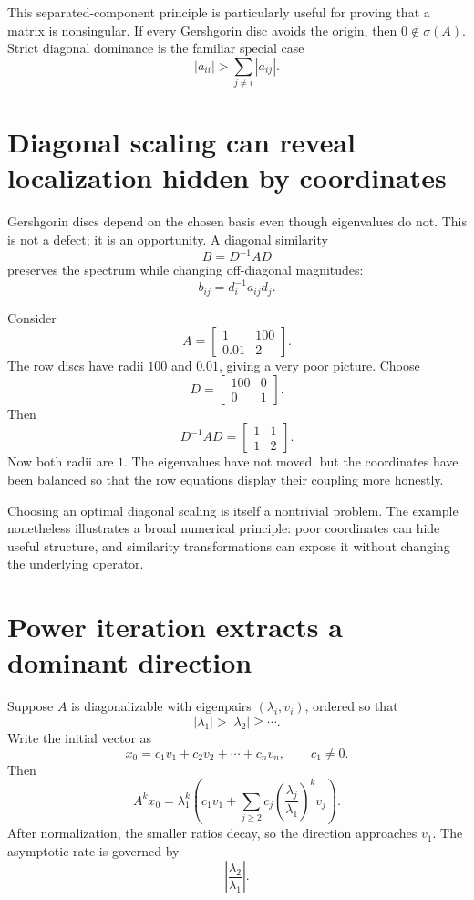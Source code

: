This separated-component principle is particularly useful for proving that a matrix is nonsingular.  If every Gershgorin disc avoids the origin, then \(0\notin\sigma(A)\).  Strict diagonal dominance is the familiar special case
\[
  |a_{ii}|>\sum_{j\ne i}|a_{ij}|.
\]

\section{Diagonal scaling can reveal localization hidden by coordinates}

Gershgorin discs depend on the chosen basis even though eigenvalues do not.  This is not a defect; it is an opportunity.  A diagonal similarity
\[
  B=D^{-1}AD
\]
preserves the spectrum while changing off-diagonal magnitudes:
\[
  b_{ij}=d_i^{-1}a_{ij}d_j.
\]

Consider
\[
  A=
  \begin{bmatrix}
    1&100\\
    0.01&2
  \end{bmatrix}.
\]
The row discs have radii \(100\) and \(0.01\), giving a very poor picture.  Choose
\[
  D=
  \begin{bmatrix}
    100&0\\
    0&1
  \end{bmatrix}.
\]
Then
\[
  D^{-1}AD
  =
  \begin{bmatrix}
    1&1\\
    1&2
  \end{bmatrix}.
\]
Now both radii are \(1\).  The eigenvalues have not moved, but the coordinates have been balanced so that the row equations display their coupling more honestly.

Choosing an optimal diagonal scaling is itself a nontrivial problem.  The example nonetheless illustrates a broad numerical principle: poor coordinates can hide useful structure, and similarity transformations can expose it without changing the underlying operator.

\section{Power iteration extracts a dominant direction}

Suppose \(A\) is diagonalizable with eigenpairs \((\lambda_i,v_i)\), ordered so that
\[
  |\lambda_1|>|\lambda_2|\ge\cdots.
\]
Write the initial vector as
\[
  x_0=c_1v_1+c_2v_2+\cdots+c_nv_n,
  \qquad c_1\ne0.
\]
Then
\[
  A^kx_0
  =\lambda_1^k
  \left(
    c_1v_1+\sum_{j\ge2}c_j
    \left(\frac{\lambda_j}{\lambda_1}\right)^kv_j
  \right).
\]
After normalization, the smaller ratios decay, so the direction approaches \(v_1\).  The asymptotic rate is governed by
\[
  \left|\frac{\lambda_2}{\lambda_1}\right|.
\]

